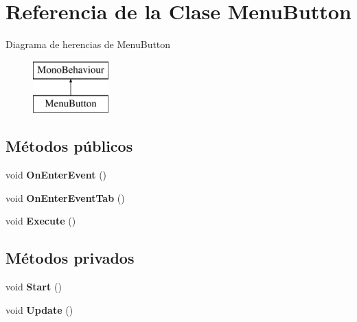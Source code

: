 \hypertarget{class_menu_button}{}\section{Referencia de la Clase Menu\+Button}
\label{class_menu_button}
Diagrama de herencias de Menu\+Button\begin{figure}[H]
\begin{center}
\leavevmode
\includegraphics[height=2.000000cm]{class_menu_button}
\end{center}
\end{figure}
\subsection*{Métodos públicos}
\begin{DoxyCompactItemize}
\item 
\mbox{\label{class_menu_button_ab023310f5a656d619dba3d006df55520}} 
void {\bfseries On\+Enter\+Event} ()
\item 
\mbox{\label{class_menu_button_ab62a32b6f3e254a883de5bb7ad6007dc}} 
void {\bfseries On\+Enter\+Event\+Tab} ()
\item 
\mbox{\label{class_menu_button_ad2cf1b797001328270ffbc6f001627e5}} 
void {\bfseries Execute} ()
\end{DoxyCompactItemize}
\subsection*{Métodos privados}
\begin{DoxyCompactItemize}
\item 
\mbox{\label{class_menu_button_a6f7a50039e0166b5c71c8c9bd1719aeb}} 
void {\bfseries Start} ()
\item 
\mbox{\label{class_menu_button_a28238191c143de2c3b917b00cdd7c292}} 
void {\bfseries Update} ()
\end{DoxyCompactItemize}
